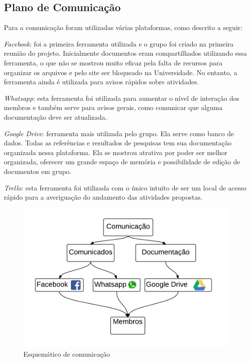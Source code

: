 \subsection{Plano de Comunica\c{c}\~ao}

Para a comunica\c{c}\~ao foram utilizadas v\'arias plataformas, como descrito a seguir:

 \textit {Facebook}: foi a primeira ferramenta utilizada e o grupo foi criado na primeira reuni\~ao do projeto. Inicialmente documentos eram compartilhados utilizando essa ferramenta, o que n\~ao se mostrou muito eficaz pela falta de recursos para organizar os arquivos e pelo site ser bloqueado na Universidade. No entanto, a ferramenta ainda \'e utilizada para avisos r\'apidos sobre atividades. 

\textit{Whatsapp}: esta ferramenta foi utilizada para aumentar o n\'ivel de intera\c{c}\~ao dos membros e tamb\'em serve para avisos gerais, como comunicar que alguma documenta\c{c}\~ao deve ser atualizada.

 \textit{Google Drive}: ferramenta mais utilizada pelo grupo. Ela serve como banco de dados. Todas as refer\^encias e resultados de pesquisas tem sua documenta\c{c}\~ao organizada nessa plataforma. Ela se mostrou atrativa por poder ser melhor organizada, oferecer um grande espa\c{c}o de mem\'oria e possibilidade de edi\c{c}\~ao de documentos em grupo.

 \textit{Trello}: esta ferramenta foi utilizada com o \'unico intuito de ser um local de acesso r\'apido para a averigua\c{c}\~ao do andamento das atividades propostas.

\begin{figure}[H]
	\centering
	\label{comunicacao}
		\includegraphics[keepaspectratio=true,scale=0.7]{planejamento/comunicacao.png}
	\caption{Esquem\'atico de comunica\c{c}\~ao}
\end{figure}

